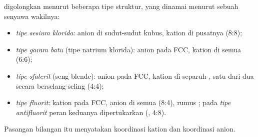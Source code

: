 \begin{definition}\label{def:b1:crystals-ionic-covalent:structure-type}
 digolongkan menurut beberapa tipe struktur, yang dinamai
menurut sebuah senyawa wakilnya:
\begin{itemize}
  \item \emph{tipe sesium klorida}: anion di
        sudut-sudut kubus, kation di pusatnya (8:8);
  \item \emph{tipe garam batu} (tipe natrium
        klorida): anion pada  FCC, kation di semua  (6:6);
  \item \emph{tipe sfalerit} (seng blende): anion
        pada  FCC, kation di separuh , satu dari
        dua secara berselang-seling (4:4);
  \item \emph{tipe fluorit}: kation pada  FCC,
        anion di semua  (8:4), rumus ; pada
        \emph{tipe antifluorit} peran keduanya
        dipertukarkan (, 4:8).
\end{itemize}
Pasangan bilangan itu menyatakan koordinasi kation dan koordinasi
anion.
\end{definition}

